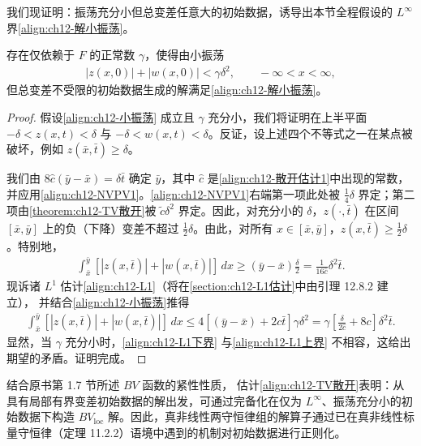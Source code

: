\documentclass[../../main.tex]{subfiles}
\begin{document}
我们现证明：振荡充分小但总变差任意大的初始数据，诱导出本节全程假设的 $L^\infty$ 界\eqref{align:ch12-解小振荡}。

\begin{theorem}\label{theorem:ch12-小振荡Linf}
存在仅依赖于 $F$ 的正常数 $\gamma$，使得由小振荡
\begin{align}
|z(x,0)|+|w(x,0)|<\gamma\delta^2,\qquad -\infty<x<\infty,
\label{align:ch12-小振荡}
\end{align}
但总变差不受限的初始数据生成的解满足\eqref{align:ch12-解小振荡}。
\end{theorem}

\begin{proof}
假设\eqref{align:ch12-小振荡} 成立且 $\gamma$ 充分小，我们将证明在上半平面 $-\delta<z(x,t)<\delta$ 与 $-\delta<w(x,t)<\delta$。反证，设上述四个不等式之一在某点被破坏，例如 $z(\bar x,\bar t)\geqslant\delta$。

我们由 $8\hat c(\bar y-\bar x)=\delta\bar t$ 确定 $\bar y$，其中 $\hat c$ 是\eqref{align:ch12-散开估计1}中出现的常数，并应用\eqref{align:ch12-NVPV1}。\eqref{align:ch12-NVPV1}右端第一项此处被 $\frac14\delta$ 界定；第二项由\cref{theorem:ch12-TV散开}被 $\tilde c\delta^2$ 界定。因此，对充分小的 $\delta$，$z(\cdot,\bar t)$ 在区间 $[\bar x,\bar y]$ 上的负（下降）变差不超过 $\frac12\delta$。由此，对所有 $x\in[\bar x,\bar y]$，$z(x,\bar t)\geqslant\frac12\delta$。特别地，
\begin{align}
\int_{\bar x}^{\bar y}[|z(x,\bar t)|+|w(x,\bar t)|]\,dx\geqslant(\bar y-\bar x)\frac{\delta}{2}=\frac{1}{16\hat c}\delta^2\bar t.
\label{align:ch12-L1下界}
\end{align}
现诉诸 $L^1$ 估计\eqref{align:ch12-L1}（将在\cref{section:ch12-L1估计}中由引理 12.8.2 建立），
并结合\eqref{align:ch12-小振荡}推得
\begin{align}
\int_{\bar x}^{\bar y}[|z(x,\bar t)|+|w(x,\bar t)|]\,dx\leqslant 4[(\bar y-\bar x)+2c\bar t]\gamma\delta^2=\gamma\left[\frac{\delta}{2\hat c}+8c\right]\delta^2\bar t.
\label{align:ch12-L1上界}
\end{align}
显然，当 $\gamma$ 充分小时，\eqref{align:ch12-L1下界} 与\eqref{align:ch12-L1上界} 不相容，这给出期望的矛盾。证明完成。
\end{proof}

结合原书第 1.7 节所述 $BV$ 函数的紧性性质，
估计\eqref{align:ch12-TV散开}表明：从具有局部有界变差初始数据的解出发，可通过完备化在仅为 $L^\infty$、振荡充分小的初始数据下构造 $BV_{\mathrm{loc}}$ 解。因此，真非线性两守恒律组的解算子通过已在真非线性标量守恒律（定理 11.2.2）语境中遇到的机制对初始数据进行正则化。
\end{document}
